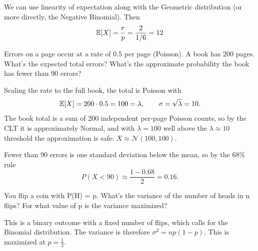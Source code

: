 \begin{solution}
We can use linearity of expectation along with the Geometric distribution (or more directly, the Negative Binomial). Then
\[
\mathbb{E}[X] = \frac{r}{p} = \frac{2}{1/6} = 12
\]
\end{solution}

\vspace{-2ex}

\begin{problem}
Errors on a page occur at a rate of 0.5 per page (Poisson). A book has 200 pages. What's the expected total errors? What's the approximate probability the book has fewer than 90 errors?
\end{problem}

\begin{solution}
Scaling the rate to the full book, the total is Poisson with
\[
\mathbb{E}[X] = 200 \cdot 0.5 = 100 = \lambda, \qquad \sigma = \sqrt{\lambda} = 10.
\]
The book total is a sum of 200 independent per-page Poisson counts, so by the CLT it is approximately Normal, and with $\lambda = 100$ well above the $\lambda \approx 10$ threshold the approximation is safe: $X \approx \mathcal{N}(100, 100)$.

Fewer than 90 errors is one standard deviation below the mean, so by the 68\% rule
\[
P(X < 90) \approx \frac{1 - 0.68}{2} = 0.16.
\]
\end{solution}

\vspace{-2ex}

\begin{problem}
You flip a coin with P(H) = p. What's the variance of the number of heads in n flips? For what value of p is the variance maximized?
\end{problem}

\begin{solution}
This is a binary outcome with a fixed number of flips, which calls for the Binomial distribution. The variance is therefore $\sigma^2 = np(1-p)$. This is maximized at $p = \frac{1}{2}$.
\end{solution}